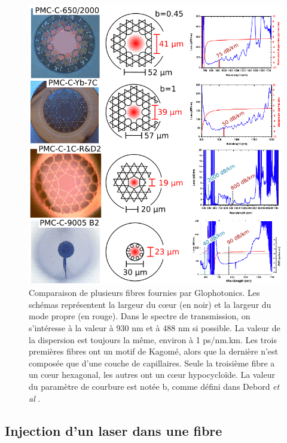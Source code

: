 \begin{figure}
    \centering
    \includegraphics[width=\textwidth]{./files/glofibers.svg.png}
    \caption{Comparaison de plusieurs fibres fournies par Glophotonics. Les schémas représentent la largeur du cœur (en noir) et la largeur du mode propre (en rouge). Dans le spectre de transmission, on s'intéresse à la valeur à 930 nm et à 488 nm si possible. La valeur de la dispersion est toujours la même, environ à 1 ps/nm.km. Les trois premières fibres ont un motif de Kagomé, alors que la dernière n'est composée que d'une couche de capillaires. Seule la troisième fibre a un cœur hexagonal, les autres ont un cœur hypocycloïde. La valeur du paramètre de courbure est notée b, comme défini dans Debord \emph{et al} \cite{debord_hypocycloid-shaped_2013}.
    \label{FIGfibercomparison}}
    \end{figure}


\subsection{Injection d'un laser dans une fibre}

